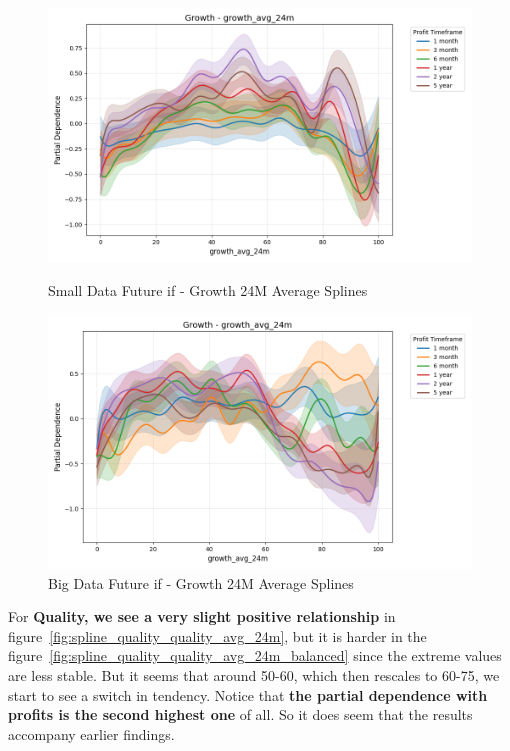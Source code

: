 \documentclass[11pt,english,a4paper,hidelinks]{book}
\begin{document}
\begin{figure}[H]
    \centering
    \begin{minipage}{0.48\textwidth}
        \centering
        \includegraphics[width=\textwidth]{images/code/models/general_regression/splines/2D/Small Data future - IF/growth_growth_avg_24m.png}
        \caption{Small Data Future \acrshort{if} - Growth 24M Average Splines}
        \label{fig:spline_growth_growth_avg_24m}
    \end{minipage}\hfill
    \begin{minipage}{0.48\textwidth}
        \centering
        \includegraphics[width=\textwidth]{images/code/models/general_regression/splines/2D/Big Data future - IF HARD Balanced/growth_growth_avg_24m.png}
        \caption{Big Data Future \acrshort{if} - Growth 24M Average Splines}
        \label{fig:spline_growth_growth_avg_24m_balanced}
    \end{minipage}
\end{figure}

\noindent For \textbf{Quality, we see a very slight positive relationship} in figure~\ref{fig:spline_quality_quality_avg_24m}, but it is harder in the figure~\ref{fig:spline_quality_quality_avg_24m_balanced} since the extreme values are less stable. But it seems that around 50-60, which then rescales to 60-75, we start to see a switch in tendency. Notice that \textbf{the partial dependence with profits is the second highest one} of all. So it does seem that the results accompany earlier findings.
\end{document}
